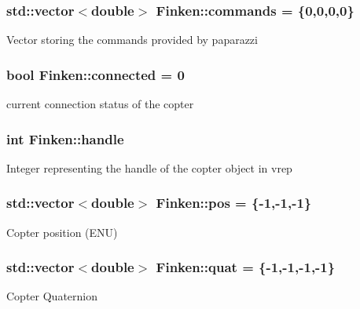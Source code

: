 \subsubsection[{\texorpdfstring{commands}{commands}}]{\setlength{\rightskip}{0pt plus 5cm}std\+::vector$<$double$>$ Finken\+::commands = \{0,0,0,0\}}\hypertarget{classFinken_aa4fe546d88b52ff92990bd67ced70567}{}\label{classFinken_aa4fe546d88b52ff92990bd67ced70567}
Vector storing the commands provided by paparazzi 
\subsubsection[{\texorpdfstring{connected}{connected}}]{\setlength{\rightskip}{0pt plus 5cm}bool Finken\+::connected = 0}\hypertarget{classFinken_a83131e08852cbcebaffa1eef80164a6e}{}\label{classFinken_a83131e08852cbcebaffa1eef80164a6e}
current connection status of the copter 
\subsubsection[{\texorpdfstring{handle}{handle}}]{\setlength{\rightskip}{0pt plus 5cm}int Finken\+::handle}\hypertarget{classFinken_a96990553bc26c8bf26effe8edd6e6369}{}\label{classFinken_a96990553bc26c8bf26effe8edd6e6369}
Integer representing the handle of the copter object in vrep 
\subsubsection[{\texorpdfstring{pos}{pos}}]{\setlength{\rightskip}{0pt plus 5cm}std\+::vector$<$double$>$ Finken\+::pos = \{-\/1,-\/1,-\/1\}}\hypertarget{classFinken_a726c0ea1d756fe0837a3f042665d8d4a}{}\label{classFinken_a726c0ea1d756fe0837a3f042665d8d4a}
Copter position (E\+NU) 
\subsubsection[{\texorpdfstring{quat}{quat}}]{\setlength{\rightskip}{0pt plus 5cm}std\+::vector$<$double$>$ Finken\+::quat = \{-\/1,-\/1,-\/1,-\/1\}}\hypertarget{classFinken_a3968cbe3b6f76678367ecb61f044a221}{}\label{classFinken_a3968cbe3b6f76678367ecb61f044a221}
Copter Quaternion 
